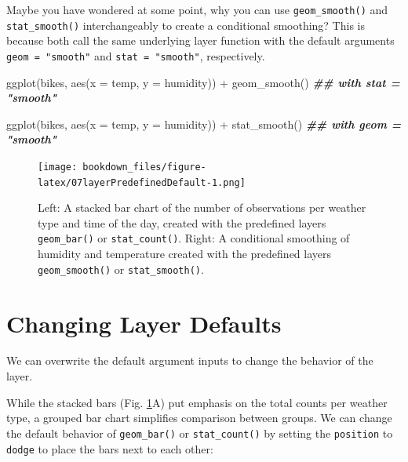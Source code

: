 \documentclass[
]{krantz}
\makeatletter
\newenvironment{Shaded}{\begin{snugshade}}{\end{snugshade}}
\newcommand{\AttributeTok}[1]{\textcolor[rgb]{0.61,0.61,0.61}{#1}}
\newcommand{\DocumentationTok}[1]{\textcolor[rgb]{0.37,0.37,0.37}{\textbf{\textit{#1}}}}
\newcommand{\FunctionTok}[1]{\textcolor[rgb]{0,0,0}{#1}}
\newcommand{\NormalTok}[1]{#1}
\newcommand{\SpecialCharTok}[1]{\textcolor[rgb]{0,0,0}{#1}}
\newenvironment{kframe}{%
\medskip{}
\setlength{\fboxsep}{.8em}
 \def\at@end@of@kframe{}%
 \ifinner\ifhmode%
  \def\at@end@of@kframe{\end{minipage}}%
  \begin{minipage}{\columnwidth}%
 \fi\fi%
 \def\FrameCommand##1{\hskip\@totalleftmargin \hskip-\fboxsep
 \colorbox{shadecolor}{##1}\hskip-\fboxsep
     \hskip-\linewidth \hskip-\@totalleftmargin \hskip\columnwidth}%
 \MakeFramed {\advance\hsize-\width
   \@totalleftmargin\z@ \linewidth\hsize
   \@setminipage}}%
 {\par\unskip\endMakeFramed%
 \at@end@of@kframe}
\renewenvironment{Shaded}{\begin{kframe}}{\end{kframe}}
\makeatother
\begin{document}
Maybe you have wondered at some point, why you can use \texttt{geom\_smooth()} and \texttt{stat\_smooth()} interchangeably to create a conditional smoothing? This is because both call the same underlying layer function with the default arguments \texttt{geom\ =\ "smooth"} and \texttt{stat\ =\ "smooth"}, respectively.

\begin{Shaded}
\begin{Highlighting}[]
\FunctionTok{ggplot}\NormalTok{(bikes, }\FunctionTok{aes}\NormalTok{(}\AttributeTok{x =}\NormalTok{ temp, }\AttributeTok{y =}\NormalTok{ humidity)) }\SpecialCharTok{+} 
  \FunctionTok{geom\_smooth}\NormalTok{() }\DocumentationTok{\#\# with \textasciigrave{}stat = "smooth"\textasciigrave{}}

\FunctionTok{ggplot}\NormalTok{(bikes, }\FunctionTok{aes}\NormalTok{(}\AttributeTok{x =}\NormalTok{ temp, }\AttributeTok{y =}\NormalTok{ humidity)) }\SpecialCharTok{+} 
  \FunctionTok{stat\_smooth}\NormalTok{() }\DocumentationTok{\#\# with \textasciigrave{}geom = "smooth"\textasciigrave{}}
\end{Highlighting}
\end{Shaded}

\begin{figure}
\centering
\texttt{[image: bookdown\_files/figure-latex/07layerPredefinedDefault-1.png]}
\caption{\label{fig:07layerPredefinedDefault}Left: A stacked bar chart of the number of observations per weather type and time of the day, created with the predefined layers \texttt{geom\_bar()} or \texttt{stat\_count()}. Right: A conditional smoothing of humidity and temperature created with the predefined layers \texttt{geom\_smooth()} or \texttt{stat\_smooth()}.}
\end{figure}

\hypertarget{changing-layer-defaults}{%
\section{Changing Layer Defaults}\label{changing-layer-defaults}}

We can overwrite the default argument inputs to change the behavior of the layer.

While the stacked bars (Fig. \ref{fig:07layerPredefinedDefault}A) put emphasis on the total counts per weather type, a grouped bar chart simplifies comparison between groups. We can change the default behavior of \texttt{geom\_bar()} or \texttt{stat\_count()} by setting the \texttt{position} to \texttt{dodge} to place the bars next to each other:
\end{document}
